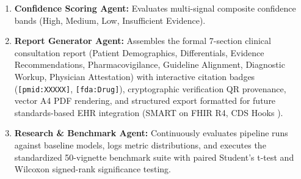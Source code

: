 \documentclass[journal,10pt,twocolumn]{IEEEtran}
\begin{document}
\begin{enumerate}
    \item \textbf{Confidence Scoring Agent:} Evaluates multi-signal composite confidence bands (High, Medium, Low, Insufficient Evidence).
    \item \textbf{Report Generator Agent:} Assembles the formal 7-section clinical consultation report (Patient Demographics, Differentials, Evidence Recommendations, Pharmacovigilance, Guideline Alignment, Diagnostic Workup, Physician Attestation) with interactive citation badges (\texttt{[pmid:XXXXX]}, \texttt{[fda:Drug]}), cryptographic verification QR provenance, vector A4 PDF rendering, and structured export formatted for future standards-based EHR integration (SMART on FHIR R4, CDS Hooks \cite{weed1968medical, mandel2016smart, cdshooks2024}).
    \item \textbf{Research \& Benchmark Agent:} Continuously evaluates pipeline runs against baseline models, logs metric distributions, and executes the standardized 50-vignette benchmark suite with paired Student's t-test and Wilcoxon signed-rank significance testing.
\end{enumerate}
\end{document}
